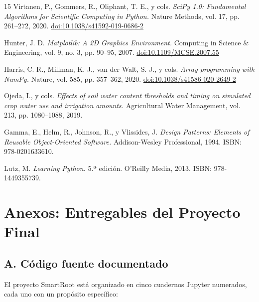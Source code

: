 \documentclass[12pt,a4paper]{article}
\begin{document}
\begin{thebibliography}{15}
Virtanen, P., Gommers, R., Oliphant, T. E., y cols.
\textit{SciPy 1.0: Fundamental Algorithms for Scientific Computing in Python.}
Nature Methods, vol. 17, pp. 261--272, 2020.
\href{https://doi.org/10.1038/s41592-019-0686-2}{doi:10.1038/s41592-019-0686-2}

Hunter, J. D.
\textit{Matplotlib: A 2D Graphics Environment.}
Computing in Science \& Engineering, vol. 9, no. 3, pp. 90--95, 2007.
\href{https://doi.org/10.1109/MCSE.2007.55}{doi:10.1109/MCSE.2007.55}

Harris, C. R., Millman, K. J., van der Walt, S. J., y cols.
\textit{Array programming with NumPy.}
Nature, vol. 585, pp. 357--362, 2020.
\href{https://doi.org/10.1038/s41586-020-2649-2}{doi:10.1038/s41586-020-2649-2}

Ojeda, I., y cols.
\textit{Effects of soil water content thresholds and timing on simulated crop water use and irrigation amounts.}
Agricultural Water Management, vol. 213, pp. 1080--1088, 2019.

Gamma, E., Helm, R., Johnson, R., y Vlissides, J.
\textit{Design Patterns: Elements of Reusable Object-Oriented Software.}
Addison-Wesley Professional, 1994. ISBN: 978-0201633610.

Lutz, M.
\textit{Learning Python.}
5.ª edición. O'Reilly Media, 2013. ISBN: 978-1449355739.

\end{thebibliography}

\newpage
\appendix
\section*{Anexos: Entregables del Proyecto Final}

\subsection*{A. Código fuente documentado}

El proyecto SmartRoot está organizado en cinco cuadernos Jupyter numerados, cada uno con un propósito específico:
\end{document}
